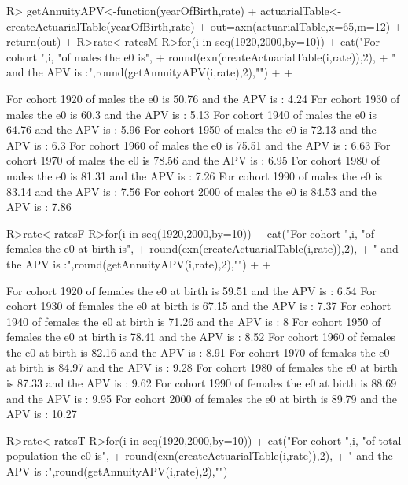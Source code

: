 \documentclass[nojss]{jss}
\begin{document}
\begin{Schunk}
\begin{Sinput}
R>	getAnnuityAPV<-function(yearOfBirth,rate) {
+ 		actuarialTable<-createActuarialTable(yearOfBirth,rate)
+ 		out=axn(actuarialTable,x=65,m=12)
+ 		return(out)
+ 	}
R>rate<-ratesM
R>for(i in seq(1920,2000,by=10)) {
+ 		cat("For cohort ",i, "of males the e0 is",
+ 		round(exn(createActuarialTable(i,rate)),2),
+ 		" and the APV is :",round(getAnnuityAPV(i,rate),2),"\n")
+ 		
+ 	}
\end{Sinput}
\begin{Soutput}
For cohort  1920 of males the e0 is 50.76  and the APV is : 4.24 
For cohort  1930 of males the e0 is 60.3  and the APV is : 5.13 
For cohort  1940 of males the e0 is 64.76  and the APV is : 5.96 
For cohort  1950 of males the e0 is 72.13  and the APV is : 6.3 
For cohort  1960 of males the e0 is 75.51  and the APV is : 6.63 
For cohort  1970 of males the e0 is 78.56  and the APV is : 6.95 
For cohort  1980 of males the e0 is 81.31  and the APV is : 7.26 
For cohort  1990 of males the e0 is 83.14  and the APV is : 7.56 
For cohort  2000 of males the e0 is 84.53  and the APV is : 7.86 
\end{Soutput}
\begin{Sinput}
R>rate<-ratesF
R>for(i in seq(1920,2000,by=10)) {
+   	cat("For cohort ",i, "of females the e0 at birth is",
+ 	round(exn(createActuarialTable(i,rate)),2),
+ 	" and the APV is :",round(getAnnuityAPV(i,rate),2),"\n")
+ 		
+ 	}
\end{Sinput}
\begin{Soutput}
For cohort  1920 of females the e0 at birth is 59.51  and the APV is : 6.54 
For cohort  1930 of females the e0 at birth is 67.15  and the APV is : 7.37 
For cohort  1940 of females the e0 at birth is 71.26  and the APV is : 8 
For cohort  1950 of females the e0 at birth is 78.41  and the APV is : 8.52 
For cohort  1960 of females the e0 at birth is 82.16  and the APV is : 8.91 
For cohort  1970 of females the e0 at birth is 84.97  and the APV is : 9.28 
For cohort  1980 of females the e0 at birth is 87.33  and the APV is : 9.62 
For cohort  1990 of females the e0 at birth is 88.69  and the APV is : 9.95 
For cohort  2000 of females the e0 at birth is 89.79  and the APV is : 10.27 
\end{Soutput}
\begin{Sinput}
R>rate<-ratesT
R>for(i in seq(1920,2000,by=10)) {
+     cat("For cohort ",i, "of total population the e0 is",
+ 		round(exn(createActuarialTable(i,rate)),2),
+ 		" and the APV is :",round(getAnnuityAPV(i,rate),2),"\n")
}
\end{Sinput}
\end{Schunk}
\end{document}
